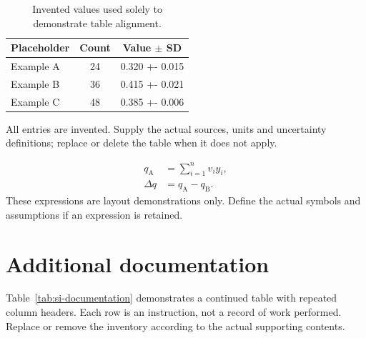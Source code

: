 \documentclass[letterpaper,11pt]{article}
\begin{document}
\begin{table}[htbp]
\centering\small
\caption{Invented values used solely to demonstrate table alignment.}
\label{tab:si-values}
\begin{tabularx}{\linewidth}{@{}>{\raggedright\arraybackslash}X
 S[table-format=2.0] S[table-format=1.3(3)]@{}}
\toprule
Placeholder & {Count} & {Value $\pm$ SD}\\
\midrule
Example A & 24 & 0.320 +- 0.015\\
Example B & 36 & 0.415 +- 0.021\\
Example C & 48 & 0.385 +- 0.006\\
\bottomrule
\end{tabularx}
\par\smallskip\footnotesize\raggedright
All entries are invented. Supply the actual sources, units and uncertainty
definitions; replace or delete the table when it does not apply.
\end{table}

\begin{equation}
\begin{split}
 q_{\mathrm{A}} &= \sum_{i=1}^{n} v_i y_i,\\
 \Delta q &= q_{\mathrm{A}}-q_{\mathrm{B}}.
\end{split}\label{eq:si-example}
\end{equation}
These expressions are layout demonstrations only. Define the actual
symbols and assumptions if an expression is retained.

\clearpage
\section{Additional documentation}
Table~\ref{tab:si-documentation} demonstrates a continued table with repeated
column headers. Each row is an instruction, not a record of work performed.
Replace or remove the inventory according to the actual supporting contents.
\end{document}

